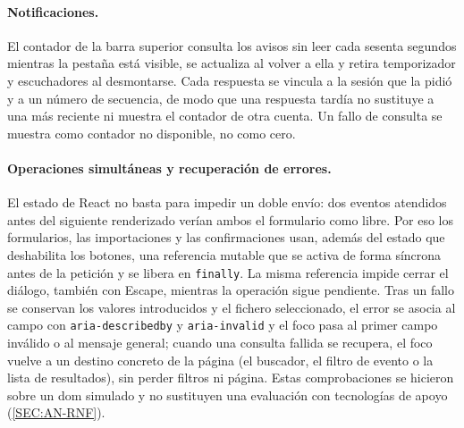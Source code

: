 \paragraph{Notificaciones.} El contador de la barra superior consulta los avisos sin leer
cada sesenta segundos mientras la pestaña está visible, se actualiza al volver a ella y
retira temporizador y escuchadores al desmontarse. Cada respuesta se vincula a la sesión que
la pidió y a un número de secuencia, de modo que una respuesta tardía no sustituye a una más
reciente ni muestra el contador de otra cuenta. Un fallo de consulta se muestra como contador
no disponible, no como cero.

\paragraph{Operaciones simultáneas y recuperación de errores.} El estado de React no basta
para impedir un doble envío: dos eventos atendidos antes del siguiente renderizado verían
ambos el formulario como libre. Por eso los formularios, las importaciones y las
confirmaciones usan, además del estado que deshabilita los botones, una referencia mutable
que se activa de forma síncrona antes de la petición y se libera en \texttt{finally}. La
misma referencia impide cerrar el diálogo, también con Escape, mientras la operación sigue
pendiente. Tras un fallo se conservan los valores introducidos y el fichero seleccionado, el
error se asocia al campo con \texttt{aria-describedby} y \texttt{aria-invalid} y el foco pasa
al primer campo inválido o al mensaje general; cuando una consulta fallida se recupera, el
foco vuelve a un destino concreto de la página (el buscador, el filtro de evento o la lista
de resultados), sin perder filtros ni página. Estas comprobaciones se hicieron sobre un
\acs{dom} simulado y no sustituyen una evaluación con tecnologías de apoyo
(\cref{SEC:AN-RNF}).
